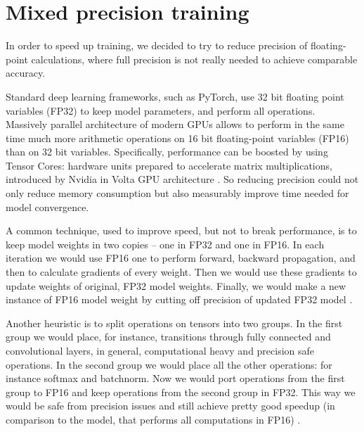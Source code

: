 \documentclass[licencjacka,en]{pracamgr}
\begin{document}
	
	
	
	
	
	
	
	
	
	
	\section{Mixed precision training}
	In order to speed up training, we decided to try to reduce precision of floating-point calculations, where full precision is not really needed to achieve comparable accuracy.
	
	Standard deep learning frameworks, such as PyTorch, use 32 bit floating point variables (FP32) to keep model parameters, and perform all operations. Massively parallel architecture of modern GPUs allows to perform in the same time much more arithmetic operations on 16 bit floating-point variables (FP16) than on 32 bit variables.
	Specifically, performance can be boosted by using Tensor Cores: hardware units prepared to accelerate matrix multiplications, introduced by Nvidia in Volta GPU architecture \cite{MPT}.
	So reducing precision could not only reduce memory consumption but also measurably improve time needed for model convergence.
	
	A common technique, used to improve speed, but not to break performance, is to keep model weights in two copies -- one in FP32 and one in FP16. In each iteration we would use FP16 one to perform forward, backward propagation, and then to calculate gradients of every weight. Then we would use these gradients to update weights of original, FP32 model weights. Finally, we would make a new instance of FP16 model weight by cutting off precision of updated FP32 model \cite{APEX}.
	
	Another heuristic is to split operations on tensors into two groups. In the first group we would place, for instance, transitions through fully connected and convolutional layers, in general, computational heavy and precision safe operations. In the second group we would place all the other operations: for instance softmax and batchnorm. Now we would port operations from the first group to FP16 and keep operations from the second group in FP32. This way we would be safe from precision issues and still achieve pretty good speedup (in comparison to the model, that performs all computations in FP16) \cite{APEX}.
	
\end{document}
